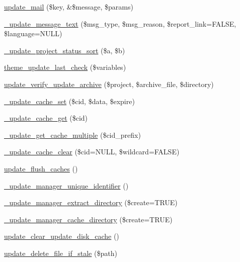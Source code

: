 \begin{DoxyCompactItemize}
\hyperlink{update_8module_aa1257da2e008c8b616daf5cf435a274b}{update\_\-mail} (\$key, \&\$message, \$params)
\item 
\hyperlink{update_8module_aeaeb10c15564cced4147737f310a8198}{\_\-update\_\-message\_\-text} (\$msg\_\-type, \$msg\_\-reason, \$report\_\-link=FALSE, \$language=NULL)
\item 
\hyperlink{update_8module_a80bf4d8130f541b0487ce74cdcd824b8}{\_\-update\_\-project\_\-status\_\-sort} (\$a, \$b)
\item 
\hyperlink{group__themeable_ga18d1e2e6354e6240afb36496fac2239a}{theme\_\-update\_\-last\_\-check} (\$variables)
\item 
\hyperlink{update_8module_afd8be1dfd15eb83f64e1ce593a5f1756}{update\_\-verify\_\-update\_\-archive} (\$project, \$archive\_\-file, \$directory)
\item 
\hyperlink{group__update__status__cache_ga3610ff1515f81f28c69b019e5482b77b}{\_\-update\_\-cache\_\-set} (\$cid, \$data, \$expire)
\item 
\hyperlink{group__update__status__cache_ga3f305bb51be069556fa20d692e286f40}{\_\-update\_\-cache\_\-get} (\$cid)
\item 
\hyperlink{group__update__status__cache_ga11c5e3cca6cd9eb1dc328f757448885f}{\_\-update\_\-get\_\-cache\_\-multiple} (\$cid\_\-prefix)
\item 
\hyperlink{group__update__status__cache_ga45fc31b5f9949fc0081ed148a9f378dd}{\_\-update\_\-cache\_\-clear} (\$cid=NULL, \$wildcard=FALSE)
\item 
\hyperlink{group__update__status__cache_ga9c94b82fd5dfa8483267b9af6042bbb2}{update\_\-flush\_\-caches} ()
\item 
\hyperlink{update_8module_aa0bce789c1af82be02444e68642d9fa2}{\_\-update\_\-manager\_\-unique\_\-identifier} ()
\item 
\hyperlink{update_8module_a4a2bc7d471c60456416dcf60978be1d9}{\_\-update\_\-manager\_\-extract\_\-directory} (\$create=TRUE)
\item 
\hyperlink{update_8module_a7ccc53a1e104d2b7b8a6b6b87e7b65f5}{\_\-update\_\-manager\_\-cache\_\-directory} (\$create=TRUE)
\item 
\hyperlink{update_8module_a8983ea011eb38001c6265043b2c793d2}{update\_\-clear\_\-update\_\-disk\_\-cache} ()
\item 
\hyperlink{update_8module_a22563c9c7f601f21fe7d2dc89aa73e2e}{update\_\-delete\_\-file\_\-if\_\-stale} (\$path)
\end{DoxyCompactItemize}


